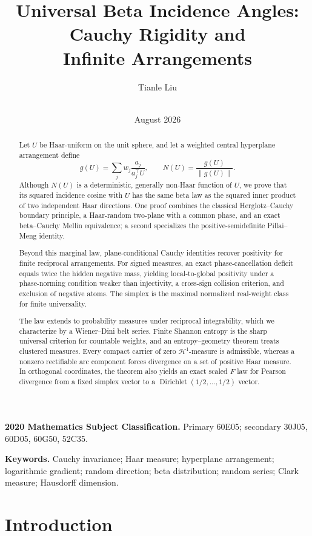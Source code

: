 \documentclass[11pt]{article}
\title{Universal Beta Incidence Angles: Cauchy Rigidity and\\
Infinite Arrangements}
\author{Tianle Liu\\
  \small\BetaIncidenceAuthorAffiliation\\
  \small\href{mailto:\BetaIncidenceAuthorEmail}
    {\texttt{\BetaIncidenceAuthorEmail}}}
\date{August 2026}
\numberwithin{equation}{section}
\theoremstyle{thmstyleone}%
\theoremstyle{thmstyletwo}%
\newcommand{\Dir}{\operatorname{Dirichlet}}
\begin{document}
\maketitle

\begin{abstract}
%
Let \(U\) be Haar-uniform on the unit sphere, and let a weighted central
hyperplane arrangement define
\[
  g(U)=\sum_j w_j\frac{a_j}{a_j^\top U},
  \qquad
  N(U)=\frac{g(U)}{\|g(U)\|}.
\]
Although \(N(U)\) is a deterministic, generally non-Haar function of \(U\),
we prove that its squared incidence cosine with \(U\) has the same beta law
as the squared inner product of two independent Haar directions.  One proof
combines the classical Herglotz--Cauchy boundary principle, a Haar-random
two-plane with a common phase, and an exact beta--Cauchy Mellin equivalence;
a second specializes the positive-semidefinite Pillai--Meng identity.

Beyond this marginal law, plane-conditional Cauchy identities recover
positivity for finite reciprocal arrangements.  For signed measures, an
exact phase-cancellation deficit equals twice the hidden negative mass,
yielding local-to-global positivity under a phase-norming condition weaker
than injectivity, a cross-sign collision criterion, and exclusion of
negative atoms.  The simplex is the maximal normalized real-weight class
for finite universality.

The law extends to probability measures under reciprocal integrability,
which we characterize by a Wiener--Dini belt series.  Finite Shannon entropy
is the sharp universal criterion for countable weights, and an
entropy--geometry theorem treats clustered measures.  Every compact carrier
of zero \(\mathcal H^1\)-measure is admissible, whereas a nonzero rectifiable
arc component forces divergence on a set of positive Haar measure.  In
orthogonal coordinates, the theorem also yields an exact scaled \(F\) law
for Pearson divergence from a fixed simplex vector to a
\(\Dir(1/2,\ldots,1/2)\) vector.
 \end{abstract}

\medskip
\noindent\textbf{2020 Mathematics Subject Classification.}
Primary 60E05; secondary 30J05, 60D05, 60G50, 52C35.

\smallskip
\noindent\textbf{Keywords.}
Cauchy invariance; Haar measure; hyperplane arrangement; logarithmic
gradient; random direction; beta distribution; random series; Clark measure;
Hausdorff dimension.

%
\section{Introduction}
\label{sec:introduction}
\end{document}
